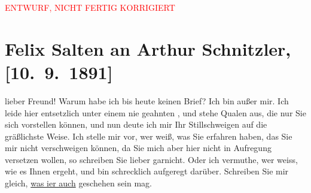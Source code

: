 
\begin{center}
            \textcolor{red}{ENTWURF, NICHT FERTIG KORRIGIERT}
                      \end{center}
            
         
         \renewcommand{\erwaehntePersonen}{Personen: Bertha Karlsburg, Felix Salten}
         \renewcommand{\erwaehnteOrte}{Orte: Hotel Stadt Pest, Miskolc, Wien}
         \renewcommand{\erwaehnteWerke}{}
               \section[Felix Salten an Arthur Schnitzler, {[}10. 9. 1891{]}]{ Felix Salten an Arthur Schnitzler, {[}10. 9. 1891{]}}\nopagebreak{}\rehead{ }\begin{ledgroupsized}[t]{13cm}\normalsize\beginnumbering \toendnotes[C]{\smallbreak\pagebreak[2]} 
\toendnotes[C]{\smallbreak}\pstart
           \noindent{}{\pb}lieber Freund! Warum habe ich bis heute keinen Brief? Ich bin außer mir. Ich leide hier entsetzlich unter einem
               nie geahnten \label{K_L03104-1v}\label{K_L03104-1h}, und stehe Qualen aus, die nur Sie sich vorstellen können, und nun deute ich
               mir Ihr Stillschweigen auf die gräßlichste Weise. Ich stelle mir vor, wer weiß, was
               Sie erfahren haben,  das Sie mir nicht verschweigen
               können, da Sie mich aber hier nicht in Aufregung
               versetzen wollen, so schreiben Sie lieber garnicht. Oder ich vermuthe, wer weiss, wie
               es Ihnen  ergeht, und bin schrecklich aufgeregt
               darüber. Schreiben Sie mir gleich, \uline{was i{\geminationm}er auch} geschehen sein mag.\pend

\end{ledgroupsized}
